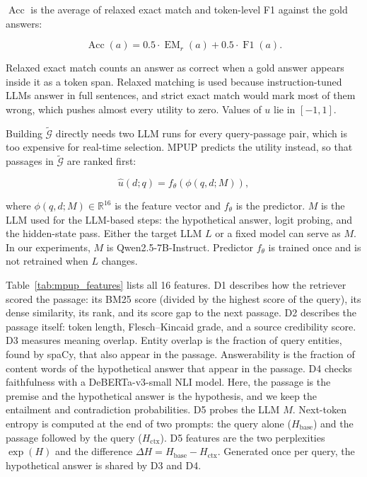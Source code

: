 \documentclass[preprint,12pt,authoryear]{elsarticle}
\begin{document}
$\operatorname{Acc}$ is the average of relaxed exact match and
token-level F1 against the gold answers:

\begin{equation}
    \operatorname{Acc}(a)
    =
    0.5 \cdot \operatorname{EM}_r(a)
    +
    0.5 \cdot \operatorname{F1}(a).
    \label{eq:acc}
\end{equation}

Relaxed exact match counts an answer as correct when a gold answer
appears inside it as a token span. Relaxed matching is used because instruction-tuned
LLMs answer in full sentences, and strict exact match would mark most
of them wrong, which pushes almost every utility to zero. Values of $u$ lie in $[-1,1]$.

Building $\widetilde{\mathcal{G}}$ directly needs two LLM runs for
every query-passage pair, which is too expensive for real-time
selection. MPUP predicts the utility instead, so that passages in
$\widetilde{\mathcal{G}}$ are ranked first:

\begin{equation}
    \hat{u}(d;q)
    =
    f_{\theta}(\phi(q,d;M)),
    \label{eq:pred}
\end{equation}

where $\phi(q,d;M)\in\mathbb{R}^{16}$ is the feature vector and
$f_{\theta}$ is the predictor. $M$ is the LLM used for the
LLM-based steps: the hypothetical answer, logit probing, and the hidden-state pass. Either the target LLM $L$ or a fixed model can serve as $M$. In our experiments, $M$ is
Qwen2.5-7B-Instruct. Predictor $f_{\theta}$ is trained once and is not retrained when $L$ changes.

Table~\ref{tab:mpup_features} lists all 16 features. D1 describes how the retriever
scored the passage: its BM25 score (divided by the highest score of
the query), its dense similarity, its rank, and its score gap to the
next passage. D2 describes the passage itself: token length,
Flesch--Kincaid grade, and a source credibility score. D3 measures
meaning overlap. Entity overlap is the fraction of query entities,
found by spaCy, that also appear in the passage. Answerability is the
fraction of content words of the hypothetical answer that appear in
the passage. D4 checks faithfulness with a DeBERTa-v3-small NLI model.
Here, the passage is the premise and the hypothetical answer is the hypothesis, and we keep the entailment and contradiction probabilities.
D5 probes the LLM $M$. Next-token entropy is computed at the end of two prompts: the query alone
($H_{\text{base}}$) and the passage followed by the query
($H_{\text{ctx}}$). D5 features are the two perplexities $\exp(H)$
and the difference
$\Delta H = H_{\text{base}} - H_{\text{ctx}}$. Generated once per query, the hypothetical answer is shared by D3 and D4.
\end{document}
